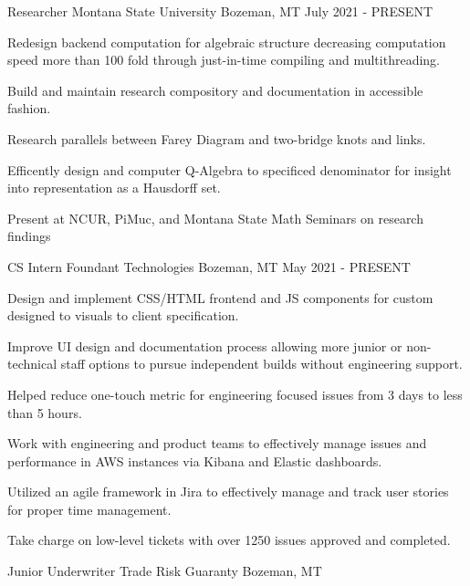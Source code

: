 
\begin{cventries}
  \cventry
    {Researcher} %
    {Montana State University} %
    {Bozeman, MT} %
    {July 2021 - PRESENT} %
    {
      \begin{cvitems} %
        \item {Redesign backend computation for algebraic structure decreasing computation speed more than 100 fold through just-in-time compiling and multithreading.}
        \item {Build and maintain research compository and documentation in accessible fashion.}
        \item {Research parallels between Farey Diagram and two-bridge knots and links.}
        \item {Efficently design and computer Q-Algebra to specificed denominator for insight into representation as a Hausdorff set.}
        \item {Present at NCUR, PiMuc, and Montana State Math Seminars on research findings}
      \end{cvitems}
    }
  \cventry
      {CS Intern}
      {Foundant Technologies}
      {Bozeman, MT}
      {May 2021 - PRESENT}
      {
        \begin{cvitems}
          \item {Design and implement CSS/HTML frontend and JS components for custom designed to visuals to client specification.}
          \item {Improve UI design and documentation process allowing more junior or non-technical staff options to pursue independent builds without engineering support.}
          \item {Helped reduce one-touch metric for engineering focused issues from 3 days to less than 5 hours.}
          \item {Work with engineering and product teams to effectively manage issues and performance in AWS instances via Kibana and Elastic dashboards.}
          \item {Utilized an agile framework in Jira to effectively manage and track user stories for proper time management.}
          \item {Take charge on low-level tickets with over 1250 issues approved and completed.}
        \end{cvitems}  
      }
  \cventry
        {Junior Underwriter}
        {Trade Risk Guaranty}
        {Bozeman, MT}

\end{cventries}
